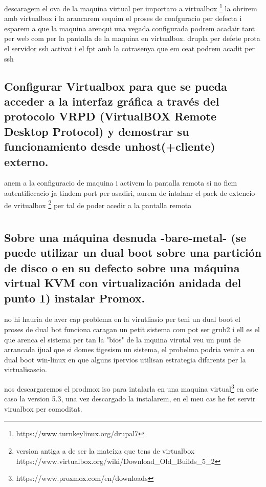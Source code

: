 \documentclass[preprint,11pt]{elsarticle}
\begin{document}
descaragem el ova de la maquina virtual per importaro a virtualbox \footnote{https://www.turnkeylinux.org/drupal7} la obrirem amb virtualbox i la arancarem sequim el proses de confguracio per defecta i esparem a que la maquina arenqui una vegada configurada podrem acadair tant per web com per la pantalla de la maquina en virtualbox. drupla per defete prota el servidor ssh activat i el fpt amb la cotrasenya que em ceat podrem acadit per ssh 

\subsection{Configurar Virtualbox para que se pueda acceder a la interfaz gráfica a través del protocolo VRPD (VirtualBOX Remote Desktop Protocol) y demostrar su funcionamiento desde unhost(+cliente) externo.}

anem a la configuracio de maquina i activem la pantalla remota si no ficm autentificcacio ja tindem port per asadiri, aurem de intalanr el pack de extencio de vritualbox \footnote{version antiga a de ser la mateixa que tens de virtualbox https://www.virtualbox.org/wiki/Download\_Old\_Builds\_5\_2} per tal de poder acedir a la pantalla remota

\section{}
\subsection{Sobre una máquina desnuda -bare-metal- (se puede utilizar un dual boot sobre una partición de disco o en su defecto sobre una máquina virtual KVM con virtualización anidada del punto 1) instalar Promox.}

no hi hauria de aver cap problema en la virutliasio per teni un dual boot el proses de dual bot funciona caragan un petit sistema com pot ser grub2 i ell es el que arenca el sistema per tan la "bios" de la mquina virutal veu un punt de arrancada ijual que si domes tigesism un sistema, el probelma podria venir a en dual boot win-linux en que alguns ipervios utilisan estrategia difarents per la virtualisascio.\smallskip

nos descargaremos el prodmox iso para intalarla en una maquina virtual\footnote{https://www.proxmox.com/en/downloads} en este caso la \newline version 5.3, una vez descargado la instalarem, en el meu cas he fet servir virualbox per comoditat.
\end{document}
